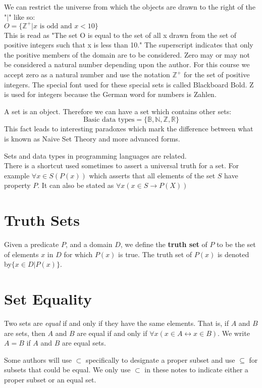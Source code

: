 \begin {notes}
 We can restrict the universe from which the objects are drawn to the right of the "$|$" like so: \\
 $O=\{\mathbb{Z}^+ | x \text{ is odd and } x<10 \}$  \\
This is read as "The set O is equal to the set of all x drawn from the set of positive integers such that x is less than 10."
The superscript indicates that only the positive members of the domain are to be considered.
Zero may or may not be considered a natural number depending upon the author. For this course we accept zero as a natural number and use the notation $\mathbb{Z}^+$ for the set of positive integers. The special font used for these special sets is called Blackboard Bold. Z is used for integers because the German word for numbers is Zahlen.
\end{notes}

  A set is an object. Therefore we can have a set which contains other sets:
  $$ \text{Basic data types} = \{\mathbb{B}, \mathbb{N}, \mathbb{Z}, \mathbb{R} \}$$
This fact leads to interesting paradoxes which mark the difference between what is known as Naive Set Theory and more advanced forms.

\begin{notes}
Sets and data types in programming languages are related.\\
There is a shortcut used sometimes to assert a universal truth for a set. For example $\forall x \in S(P(x))$ which asserts that all elements of the set $S$ have property $P$. It can also be stated as $\forall x(x \in S \rightarrow P(X))$
\end{notes}

\section {Truth Sets}
\begin {definition}
Given a predicate $P$, and a domain $D$, we define the \textbf{truth set} of $P$ to be the set of elements $x$ in $D$ for which $P(x)$ is true. The truth set of $P(x)$ is denoted by$ \{ x \in D | P(x) \} $.
\end {definition}

  
\section {Set Equality}
\begin {definition}
Two sets are \textit{equal} if and only if they have the same elements. That is, if $A$ and $B$ are sets, then $A$ and $B$ are equal if and only if $\forall x(x \in A \leftrightarrow x \in B)$. We write $A=B$ if $A$ and $B$ are equal sets.
\end {definition}
\begin{notes}
Some authors will use $\subset$ specifically to designate a proper subset and use $\subseteq$ for subsets that could be equal. We only use $\subset$ in these notes to indicate either a proper subset or an equal set.
\end{notes}
  
